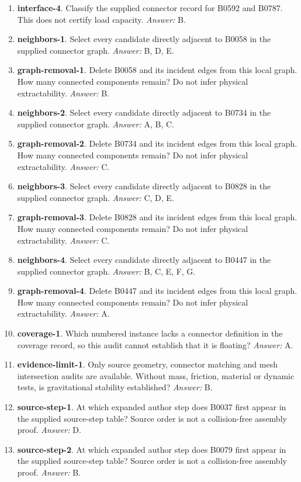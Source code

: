 \begin{enumerate}
\item \textbf{interface-4}. Classify the supplied connector record for B0592 and B0787. This does not certify load capacity. \textit{Answer:} B.
\item \textbf{neighbors-1}. Select every candidate directly adjacent to B0058 in the supplied connector graph. \textit{Answer:} B, D, E.
\item \textbf{graph-removal-1}. Delete B0058 and its incident edges from this local graph. How many connected components remain? Do not infer physical extractability. \textit{Answer:} B.
\item \textbf{neighbors-2}. Select every candidate directly adjacent to B0734 in the supplied connector graph. \textit{Answer:} A, B, C.
\item \textbf{graph-removal-2}. Delete B0734 and its incident edges from this local graph. How many connected components remain? Do not infer physical extractability. \textit{Answer:} C.
\item \textbf{neighbors-3}. Select every candidate directly adjacent to B0828 in the supplied connector graph. \textit{Answer:} C, D, E.
\item \textbf{graph-removal-3}. Delete B0828 and its incident edges from this local graph. How many connected components remain? Do not infer physical extractability. \textit{Answer:} C.
\item \textbf{neighbors-4}. Select every candidate directly adjacent to B0447 in the supplied connector graph. \textit{Answer:} B, C, E, F, G.
\item \textbf{graph-removal-4}. Delete B0447 and its incident edges from this local graph. How many connected components remain? Do not infer physical extractability. \textit{Answer:} A.
\item \textbf{coverage-1}. Which numbered instance lacks a connector definition in the coverage record, so this audit cannot establish that it is floating? \textit{Answer:} A.
\item \textbf{evidence-limit-1}. Only source geometry, connector matching and mesh intersection audits are available. Without mass, friction, material or dynamic tests, is gravitational stability established? \textit{Answer:} B.
\item \textbf{source-step-1}. At which expanded author step does B0037 first appear in the supplied source-step table? Source order is not a collision-free assembly proof. \textit{Answer:} D.
\item \textbf{source-step-2}. At which expanded author step does B0079 first appear in the supplied source-step table? Source order is not a collision-free assembly proof. \textit{Answer:} B.

\end{enumerate}
